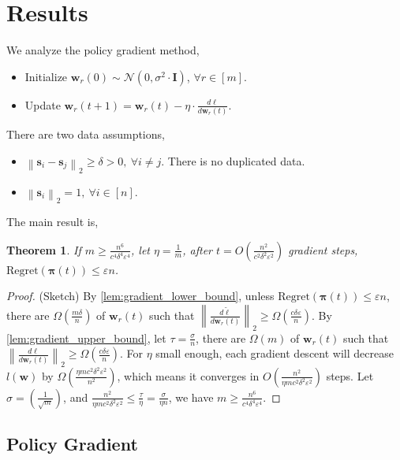\documentclass[10pt]{article}
\def\rvs{{\mathbf{s}}}
\def\rvw{{\mathbf{w}}}
\def\regret{{\text{Regret}}}
\newtheorem{thm}{Theorem}
\def\rvpi{{\boldsymbol{\pi}}}
\def\rmI{{\mathbf{I}}}
\def\gN{{\mathcal{N}}}
\begin{document}
\section{Results}

We analyze the policy gradient method,
\begin{itemize}
	\item Initialize $\rvw_r(0) \sim \gN(0, \sigma^2 \cdot \rmI)$, $\forall r \in [m]$.
	\item Update $\rvw_r(t+1) = \rvw_r(t) - \eta \cdot \frac{d\ell}{d \rvw_r(t)}$.
\end{itemize}

\noindent There are two data assumptions,
\begin{itemize}
	\item $\left\| \rvs_{i} -  \rvs_{j} \right\|_2 \ge \delta > 0 , \ \forall i \not= j$. There is no duplicated data.
	\item $\left\| \rvs_{i} \right\|_2 = 1, \ \forall i \in [n]$.
\end{itemize}

\noindent The main result is,
\begin{thm}
	If $m \ge \frac{n^6}{c^4 \delta^4 \varepsilon^4}$, let $\eta = \frac{1}{m}$, after $t = O\left( \frac{n^2}{ c^2\delta^2\varepsilon^2} \right)$ gradient steps, $\regret\left( \rvpi(t)\right) \le \varepsilon n$.
\end{thm}
\begin{proof}
(Sketch) By \cref{lem:gradient_lower_bound}, unless $\regret\left( \rvpi(t)\right) \le \varepsilon n$, there are $\Omega\left( \frac{m\delta}{n} \right)$ of $\rvw_r(t)$ such that $\left\| \frac{d\tilde{\ell}}{d \rvw_r(t)} \right\|_2 \ge \Omega\left( \frac{c\delta \varepsilon}{n} \right)$. By \cref{lem:gradient_upper_bound}, let $\tau = \frac{\sigma}{n}$, there are $\Omega\left( m \right)$ of $\rvw_r(t)$ such that $\left\| \frac{d\ell}{d \rvw_r(t)} \right\|_2 \ge \Omega\left( \frac{c\delta \varepsilon}{n} \right)$. For $\eta$ small enough, each gradient descent will decrease $l(\rvw)$ by $\Omega\left( \frac{\eta m c^2\delta^2\varepsilon^2}{n^2} \right)$, which means it converges in $O\left( \frac{n^2}{\eta m c^2\delta^2\varepsilon^2} \right)$ steps. Let $\sigma = \left( \frac{1}{\sqrt{m}} \right)$, and $\frac{n^2}{\eta m c^2\delta^2\varepsilon^2} \le \frac{\tau}{\eta} = \frac{\sigma}{\eta n}$, we have $m \ge \frac{n^6}{c^4 \delta^4 \varepsilon^4}$.
\end{proof}

\subsection{Policy Gradient}
\end{document}
